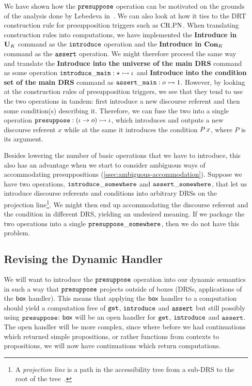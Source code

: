 We have shown how the $\mathtt{presuppose}$ operation can be motivated on the
grounds of the analysis done by Lebedeva
in~\cite{lebedeva2012expression}. We can also look at how it ties to the
DRT construction rule for presupposition triggers such as $\mathrm{CR.PN}$. When
translating construction rules into computations, we have implemented the
\textbf{Introduce in $\mathbf{U}_K$} command as the $\mathtt{introduce}$
operation and the \textbf{Introduce in $\mathbf{Con}_K$} command as the
$\mathtt{assert}$ operation. We might therefore proceed the same way and
translate the \textbf{Introduce into the universe of the main DRS} command
as some operation $\mathtt{introduce\_main} : \star \rightarrowtail \iota$ and
\textbf{Introduce into the condition set of the main DRS} command as
$\mathtt{assert\_main} : o \rightarrowtail 1$. However, by looking at the construction
rules of presupposition triggers, we see that they tend to use the two
operations in tandem: first introduce a new discourse referent and then
some condition(s) describing it. Therefore, we can fuse the two into a
single operation $\mathtt{presuppose} : (\iota \to o) \rightarrowtail \iota$, which
introduces and outputs a new discourse referent $x$ while at the same it
introduces the condition $P\,x$, where $P$ is its argument.

Besides lowering the number of basic operations that we have to introduce,
this also has an advantage when we start to consider ambiguous ways of
accommodating presuppositions
(\ref{ssec:ambiguous-accommodation}). Suppose we have two operations,
$\mathtt{introduce\_somewhere}$ and $\mathtt{assert\_somewhere}$, that let us
introduce discourse referents and conditions into arbitrary DRSs on the
projection line\footnote{A \emph{projection line} is a path in the
  accessibility tree from a sub-DRS to the root of the
  tree~\cite{van1992presupposition}.}. We might then end up accommodating
the discourse referent and the condition in different DRS, yielding an
undesired meaning. If we package the two operations into a single
$\mathtt{presuppose\_somewhere}$, then we do not have this problem.


\subsection{Revising the Dynamic Handler}
\label{ssec:revising-dynamic-handler}

We will want to introduce the $\mathtt{presuppose}$ operation into our dynamic
semantics in such a way that $\mathtt{presuppose}$ projects outside of boxes
(DRSs, applications of the $\textsf{box}$ handler). This means that applying the
$\textsf{box}$ handler to a computation should yield a computation free of
$\mathtt{get}$, $\mathtt{introduce}$ and $\mathtt{assert}$ but still possibly using
$\mathtt{presuppose}$: $\textsf{box}$ will be an open handler for $\mathtt{get}$,
$\mathtt{introduce}$ and $\mathtt{assert}$. The open handler will be more complex,
since where before we had continuations which returned simple propositions,
or rather functions from contexts to propositions, we will now have
continuations which return computations.

